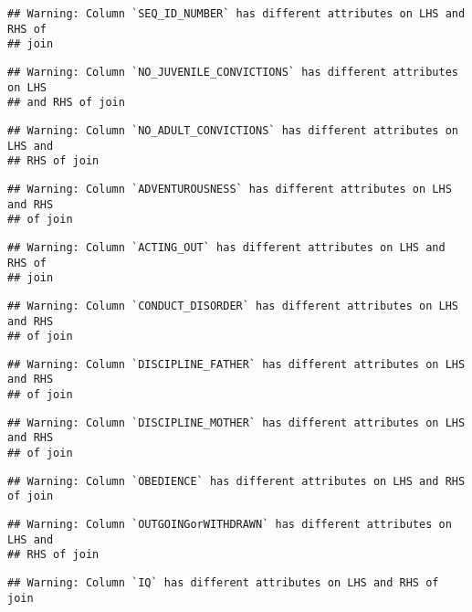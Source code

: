 \documentclass[]{article}
\begin{document}
\begin{verbatim}
## Warning: Column `SEQ_ID_NUMBER` has different attributes on LHS and RHS of
## join
\end{verbatim}

\begin{verbatim}
## Warning: Column `NO_JUVENILE_CONVICTIONS` has different attributes on LHS
## and RHS of join
\end{verbatim}

\begin{verbatim}
## Warning: Column `NO_ADULT_CONVICTIONS` has different attributes on LHS and
## RHS of join
\end{verbatim}

\begin{verbatim}
## Warning: Column `ADVENTUROUSNESS` has different attributes on LHS and RHS
## of join
\end{verbatim}

\begin{verbatim}
## Warning: Column `ACTING_OUT` has different attributes on LHS and RHS of
## join
\end{verbatim}

\begin{verbatim}
## Warning: Column `CONDUCT_DISORDER` has different attributes on LHS and RHS
## of join
\end{verbatim}

\begin{verbatim}
## Warning: Column `DISCIPLINE_FATHER` has different attributes on LHS and RHS
## of join
\end{verbatim}

\begin{verbatim}
## Warning: Column `DISCIPLINE_MOTHER` has different attributes on LHS and RHS
## of join
\end{verbatim}

\begin{verbatim}
## Warning: Column `OBEDIENCE` has different attributes on LHS and RHS of join
\end{verbatim}

\begin{verbatim}
## Warning: Column `OUTGOINGorWITHDRAWN` has different attributes on LHS and
## RHS of join
\end{verbatim}

\begin{verbatim}
## Warning: Column `IQ` has different attributes on LHS and RHS of join
\end{verbatim}
\end{document}
